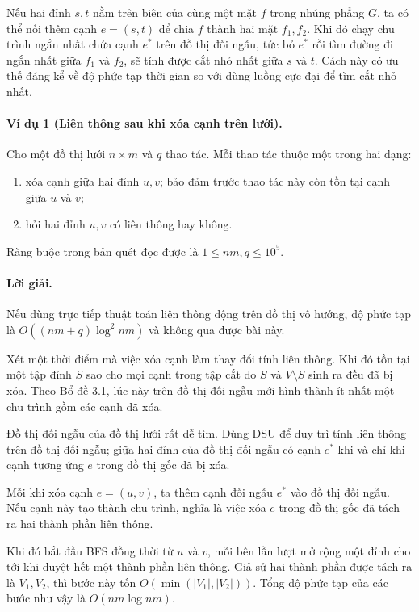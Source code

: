 \documentclass[11pt]{article}
\begin{document}
Nếu hai đỉnh $s,t$ nằm trên biên của cùng một mặt $f$ trong nhúng phẳng $G$, ta
có thể nối thêm cạnh $e=(s,t)$ để chia $f$ thành hai mặt $f_1,f_2$. Khi đó chạy
chu trình ngắn nhất chứa cạnh $e^*$ trên đồ thị đối ngẫu, tức bỏ $e^*$ rồi tìm
đường đi ngắn nhất giữa $f_1$ và $f_2$, sẽ tính được cắt nhỏ nhất giữa $s$ và
$t$. Cách này có ưu thế đáng kể về độ phức tạp thời gian so với dùng luồng cực
đại để tìm cắt nhỏ nhất.

\paragraph{Ví dụ 1 (Liên thông sau khi xóa cạnh trên lưới).}
Cho một đồ thị lưới $n\times m$ và $q$ thao tác. Mỗi thao tác thuộc một trong
hai dạng:
\begin{enumerate}
  \item xóa cạnh giữa hai đỉnh $u,v$; bảo đảm trước thao tác này còn tồn tại
  cạnh giữa $u$ và $v$;
  \item hỏi hai đỉnh $u,v$ có liên thông hay không.
\end{enumerate}
Ràng buộc trong bản quét đọc được là $1\le nm,q\le 10^5$.

\paragraph{Lời giải.}
Nếu dùng trực tiếp thuật toán liên thông động trên đồ thị vô hướng, độ phức tạp
là $O((nm+q)\log^2 nm)$ và không qua được bài này.

Xét một thời điểm mà việc xóa cạnh làm thay đổi tính liên thông. Khi đó tồn tại
một tập đỉnh $S$ sao cho mọi cạnh trong tập cắt do $S$ và $V\setminus S$ sinh
ra đều đã bị xóa. Theo Bổ đề 3.1, lúc này trên đồ thị đối ngẫu mới hình thành
ít nhất một chu trình gồm các cạnh đã xóa.

Đồ thị đối ngẫu của đồ thị lưới rất dễ tìm. Dùng DSU để duy trì tính liên thông
trên đồ thị đối ngẫu; giữa hai đỉnh của đồ thị đối ngẫu có cạnh $e^*$ khi và
chỉ khi cạnh tương ứng $e$ trong đồ thị gốc đã bị xóa.

Mỗi khi xóa cạnh $e=(u,v)$, ta thêm cạnh đối ngẫu $e^*$ vào đồ thị đối ngẫu.
Nếu cạnh này tạo thành chu trình, nghĩa là việc xóa $e$ trong đồ thị gốc đã
tách ra hai thành phần liên thông.

Khi đó bắt đầu BFS đồng thời từ $u$ và $v$, mỗi bên lần lượt mở rộng một đỉnh
cho tới khi duyệt hết một thành phần liên thông. Giả sử hai thành phần được
tách ra là $V_1,V_2$, thì bước này tốn $O(\min(|V_1|,|V_2|))$. Tổng độ phức tạp
của các bước như vậy là $O(nm\log nm)$.
\end{document}
